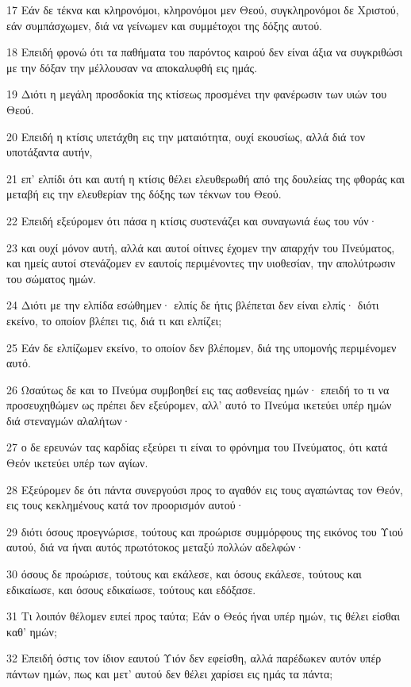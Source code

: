 \par 17 Εάν δε τέκνα και κληρονόμοι, κληρονόμοι μεν Θεού, συγκληρονόμοι δε Χριστού, εάν συμπάσχωμεν, διά να γείνωμεν και συμμέτοχοι της δόξης αυτού.
\par 18 Επειδή φρονώ ότι τα παθήματα του παρόντος καιρού δεν είναι άξια να συγκριθώσι με την δόξαν την μέλλουσαν να αποκαλυφθή εις ημάς.
\par 19 Διότι η μεγάλη προσδοκία της κτίσεως προσμένει την φανέρωσιν των υιών του Θεού.
\par 20 Επειδή η κτίσις υπετάχθη εις την ματαιότητα, ουχί εκουσίως, αλλά διά τον υποτάξαντα αυτήν,
\par 21 επ' ελπίδι ότι και αυτή η κτίσις θέλει ελευθερωθή από της δουλείας της φθοράς και μεταβή εις την ελευθερίαν της δόξης των τέκνων του Θεού.
\par 22 Επειδή εξεύρομεν ότι πάσα η κτίσις συστενάζει και συναγωνιά έως του νύν·
\par 23 και ουχί μόνον αυτή, αλλά και αυτοί οίτινες έχομεν την απαρχήν του Πνεύματος, και ημείς αυτοί στενάζομεν εν εαυτοίς περιμένοντες την υιοθεσίαν, την απολύτρωσιν του σώματος ημών.
\par 24 Διότι με την ελπίδα εσώθημεν· ελπίς δε ήτις βλέπεται δεν είναι ελπίς· διότι εκείνο, το οποίον βλέπει τις, διά τι και ελπίζει;
\par 25 Εάν δε ελπίζωμεν εκείνο, το οποίον δεν βλέπομεν, διά της υπομονής περιμένομεν αυτό.
\par 26 Ωσαύτως δε και το Πνεύμα συμβοηθεί εις τας ασθενείας ημών· επειδή το τι να προσευχηθώμεν ως πρέπει δεν εξεύρομεν, αλλ' αυτό το Πνεύμα ικετεύει υπέρ ημών διά στεναγμών αλαλήτων·
\par 27 ο δε ερευνών τας καρδίας εξεύρει τι είναι το φρόνημα του Πνεύματος, ότι κατά Θεόν ικετεύει υπέρ των αγίων.
\par 28 Εξεύρομεν δε ότι πάντα συνεργούσι προς το αγαθόν εις τους αγαπώντας τον Θεόν, εις τους κεκλημένους κατά τον προορισμόν αυτού·
\par 29 διότι όσους προεγνώρισε, τούτους και προώρισε συμμόρφους της εικόνος του Υιού αυτού, διά να ήναι αυτός πρωτότοκος μεταξύ πολλών αδελφών·
\par 30 όσους δε προώρισε, τούτους και εκάλεσε, και όσους εκάλεσε, τούτους και εδικαίωσε, και όσους εδικαίωσε, τούτους και εδόξασε.
\par 31 Τι λοιπόν θέλομεν ειπεί προς ταύτα; Εάν ο Θεός ήναι υπέρ ημών, τις θέλει είσθαι καθ' ημών;
\par 32 Επειδή όστις τον ίδιον εαυτού Υιόν δεν εφείσθη, αλλά παρέδωκεν αυτόν υπέρ πάντων ημών, πως και μετ' αυτού δεν θέλει χαρίσει εις ημάς τα πάντα;
